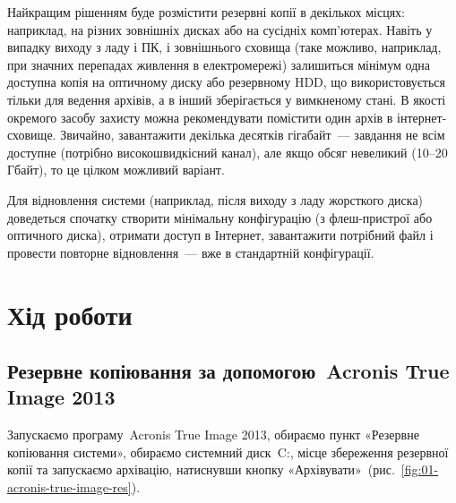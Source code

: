 \documentclass[
	a4paper,
	oneside,
	DIV = 12,
	fontsize = 13pt,
	headings = normal,
]{scrartcl}
\begin{document}
		Найкращим рішенням буде розмістити резервні копії в декількох місцях: наприклад, на різних зовнішніх дисках або на сусідніх комп'ютерах. Навіть у випадку виходу з ладу і ПК, і зовнішнього сховища (таке можливо, наприклад, при значних перепадах живлення в електромережі) залишиться мінімум одна доступна копія на оптичному диску або резервному \textenglish{HDD}, що використовується тільки для ведення архівів, а в інший зберігається у вимкненому стані. В якості окремого засобу захисту можна рекомендувати помістити один архів в інтернет-сховище. Звичайно, завантажити декілька десятків гігабайт~— завдання не всім доступне (потрібно високошвидкісний канал), але якщо обсяг невеликий (10–20 Гбайт), то це цілком можливий варіант. 

		Для відновлення системи (наприклад, після виходу з ладу жорсткого диска) доведеться спочатку створити мінімальну конфігурацію (з флеш-пристрої або оптичного диска), отримати доступ в Інтернет, завантажити потрібний файл і провести повторне відновлення~— вже в стандартній конфігурації.

	\section{Хід роботи}
		\subsection{Резервне копіювання за допомогою~\textenglish{Acronis True Image 2013}}
			Запускаємо програму~\textenglish{Acronis True Image 2013}, обираємо пункт «Резервне копіювання системи», обираємо системний диск~\textenglish{C:}, місце збереження резервної копії та запускаємо архівацію, натиснувши кнопку «Архівувати»~(рис.~\ref{fig:01-acronis-true-image-res}).
\end{document}

